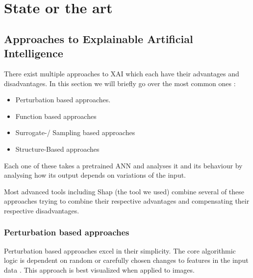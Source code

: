 \chapter{State or the art}
\label{ch:stateOfTheArt}

\section{Approaches to Explainable Artificial Intelligence}

There exist multiple approaches to XAI which each have their advantages and disadvantages. In this section we will briefly go over the most common ones \cite{XAIMethods}:
\begin{itemize}
    \item Perturbation based approaches.
    \item Function based approaches
    \item Surrogate-/ Sampling based approaches
    \item Structure-Based approaches
\end{itemize}

Each one of these takes a pretrained ANN and analyses it and its behaviour by analysing how its output depends on variations of the input.


Most advanced tools including Shap \cite{NIPS2017_7062} (the tool we used) combine several of these approaches trying to combine their respective advantages and compensating their respective disadvantages.

\subsection{Perturbation based approaches}

Perturbation based approaches excel in their simplicity. The core algorithmic logic is dependent on random or carefully chosen changes to features in the input data \cite{das2020opportunities}. This approach is best visualized when applied to images.


